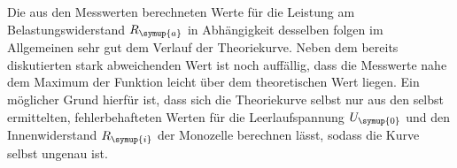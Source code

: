 Die aus den Messwerten berechneten Werte für die Leistung am Belastungswiderstand
$R_{\symup{a}}$ in Abhängigkeit desselben folgen im Allgemeinen sehr gut dem Verlauf
der Theoriekurve. Neben dem bereits diskutierten stark abweichenden Wert ist noch
auffällig, dass die Messwerte nahe dem Maximum der Funktion leicht über dem theoretischen
Wert liegen. Ein möglicher Grund hierfür ist, dass sich die Theoriekurve selbst
nur aus den selbst ermittelten, fehlerbehafteten Werten für die Leerlaufspannung
$U_{\symup{0}}$ und den Innenwiderstand $R_{\symup{i}}$ der Monozelle
berechnen lässt, sodass die Kurve selbst ungenau ist.

